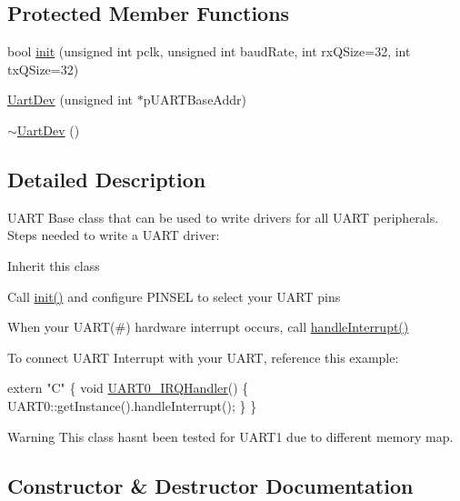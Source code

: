 \subsection*{Protected Member Functions}
\begin{DoxyCompactItemize}
\item 
bool \hyperlink{classUartDev_ab1052b8bbe73934f0f171c5e7f52d588}{init} (unsigned int pclk, unsigned int baud\+Rate, int rx\+Q\+Size=32, int tx\+Q\+Size=32)
\item 
\hyperlink{classUartDev_a41e9d43a209a845a5cf74d65e801817b}{Uart\+Dev} (unsigned int $\ast$p\+U\+A\+R\+T\+Base\+Addr)
\item 
\hyperlink{classUartDev_a8345a2c92126476300b8f4b5c2aca150}{$\sim$\+Uart\+Dev} ()
\end{DoxyCompactItemize}


\subsection{Detailed Description}
U\+A\+RT Base class that can be used to write drivers for all U\+A\+RT peripherals. Steps needed to write a U\+A\+RT driver\+:
\begin{DoxyItemize}
\item Inherit this class
\item Call \hyperlink{classUartDev_ab1052b8bbe73934f0f171c5e7f52d588}{init()} and configure P\+I\+N\+S\+EL to select your U\+A\+RT pins
\item When your U\+A\+RT(\#) hardware interrupt occurs, call \hyperlink{classUartDev_a88db44755fb545c2553cabf95a338db4}{handle\+Interrupt()}
\end{DoxyItemize}

To connect U\+A\+RT Interrupt with your U\+A\+RT, reference this example\+: 
\begin{DoxyCode}
\textcolor{keyword}{extern} \textcolor{stringliteral}{"C"}
\{
    \textcolor{keywordtype}{void} \hyperlink{startup_8cpp_afd2c7dd1041a4bb8a7b41496dd9ee0b7}{UART0\_IRQHandler}()
    \{
        UART0::getInstance().handleInterrupt();
    \}
 \}
\end{DoxyCode}


\begin{DoxyWarning}{Warning}
This class hasn\textquotesingle{}t been tested for U\+A\+R\+T1 due to different memory map. 
\end{DoxyWarning}


\subsection{Constructor \& Destructor Documentation}
